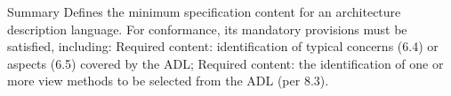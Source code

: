 \documentclass[10pt,letterpaper]{article}
\begin{document}
\begin{CornellSummaryBox}{Summary}
Defines the minimum specification content for an architecture description language. For conformance, its mandatory provisions must be satisfied, including: Required content: identification of typical concerns (6.4) or aspects (6.5) covered by the ADL; Required content: the identification of one or more view methods to be selected from the ADL (per 8.3).
\end{CornellSummaryBox}
\end{document}
